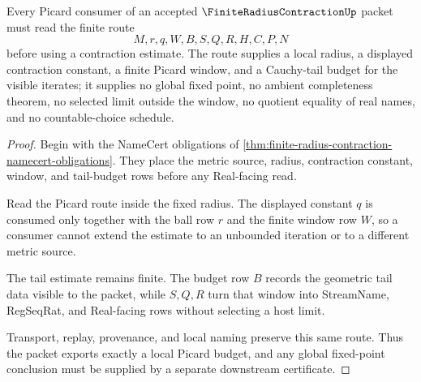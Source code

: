 \begin{theorem}
\label{thm:finite-radius-contraction-picard-budget}
Every Picard consumer of an accepted $\FiniteRadiusContractionUp$ packet must read the finite route
$$
M,r,q,W,B,S,Q,R,H,C,P,N
$$
before using a contraction estimate. The route supplies a local radius, a displayed contraction constant, a finite Picard window, and a Cauchy-tail budget for the visible iterates; it supplies no global fixed point, no ambient completeness theorem, no selected limit outside the window, no quotient equality of real names, and no countable-choice schedule.
\end{theorem}
\begin{proof}
Begin with the NameCert obligations of \autoref{thm:finite-radius-contraction-namecert-obligations}. They place the metric source, radius, contraction constant, window, and tail-budget rows before any Real-facing read.

Read the Picard route inside the fixed radius. The displayed constant $q$ is consumed only together with the ball row $r$ and the finite window row $W$, so a consumer cannot extend the estimate to an unbounded iteration or to a different metric source.

The tail estimate remains finite. The budget row $B$ records the geometric tail data visible to the packet, while $S,Q,R$ turn that window into StreamName, RegSeqRat, and Real-facing rows without selecting a host limit.

Transport, replay, provenance, and local naming preserve this same route. Thus the packet exports exactly a local Picard budget, and any global fixed-point conclusion must be supplied by a separate downstream certificate.
\end{proof}



